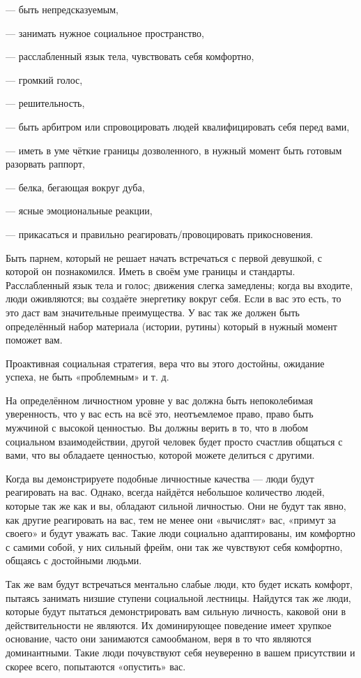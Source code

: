 --- быть непредсказуемым,

--- занимать нужное социальное пространство,

--- расслабленный язык тела, чувствовать себя комфортно,

--- громкий голос,

--- решительность,

--- быть арбитром или спровоцировать людей квалифицировать себя перед вами,

--- иметь в уме чёткие границы дозволенного, в нужный момент быть готовым разорвать раппорт,

--- белка, бегающая вокруг дуба,

--- ясные эмоциональные реакции,

--- прикасаться и правильно реагировать/провоцировать прикосновения.

Быть парнем, который не решает начать встречаться с первой девушкой, с которой он познакомился. Иметь в своём уме границы и стандарты. Расслабленный язык тела и голос; движения слегка замедлены; когда вы входите, люди оживляются; вы создаёте энергетику вокруг себя. Если в вас это есть, то это даст вам значительные преимущества. У вас так же должен быть определённый набор материала (истории, рутины) который в нужный момент поможет вам.

Проактивная социальная стратегия, вера что вы этого достойны, ожидание успеха, не быть «проблемным» и т. д.

На определённом личностном уровне у вас должна быть непоколебимая уверенность, что у вас есть на всё это, неотъемлемое право, право быть мужчиной с высокой ценностью. Вы должны верить в то, что в любом социальном взаимодействии, другой человек будет просто счастлив общаться с вами, что вы обладаете ценностью, которой можете делиться с другими.

Когда вы демонстрируете подобные личностные качества --- люди будут реагировать на вас. Однако, всегда найдётся небольшое количество людей, которые так же как и вы, обладают сильной личностью. Они не будут так явно, как другие реагировать на вас, тем не менее они «вычислят» вас, «примут за своего» и будут уважать вас. Такие люди социально адаптированы, им комфортно с самими собой, у них сильный фрейм, они так же чувствуют себя комфортно, общаясь с достойными людьми.

Так же вам будут встречаться ментально слабые люди, кто будет искать комфорт, пытаясь занимать низшие ступени социальной лестницы. Найдутся так же люди, которые будут пытаться демонстрировать вам сильную личность, каковой они в действительности не являются. Их доминирующее поведение имеет хрупкое основание, часто они занимаются самообманом, веря в то что являются доминантными. Такие люди почувствуют себя неуверенно в вашем присутствии и скорее всего, попытаются «опустить» вас.

